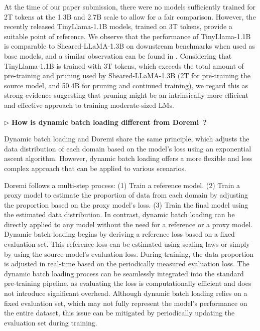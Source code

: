 At the time of our paper submission, there were no models sufficiently trained for 2T tokens at the 1.3B and 2.7B scale to allow for a fair comparison. However, the recently released TinyLlama-1.1B models, trained on 3T tokens, provide a suitable point of reference. We observe that the performance of TinyLlama-1.1B is comparable to Sheared-LLaMA-1.3B on downstream benchmarks when used as base models, and a similar observation can be found in \citet{wang2023pangu}.
Considering that TinyLlama-1.1B is trained with 3T tokens, which exceeds the total amount of pre-training and pruning used by Sheared-LLaMA-1.3B (2T for pre-training the source model, and 50.4B for pruning and continued training), we regard this as strong evidence suggesting that pruning might be an intrinsically more efficient and effective approach to training moderate-sized LMs.

$\triangleright$ \textbf{How is dynamic batch loading different from Doremi~\citep{xie2023doremi}?}

Dynamic batch loading and Doremi share the same principle, which adjusts the data distribution of each domain based on the model's loss using an exponential ascent algorithm. However, dynamic batch loading offers a more flexible and less complex approach that can be applied to various scenarios.

Doremi follows a multi-step process: (1) Train a reference model. (2) Train a proxy model to estimate the proportion of data from each domain by adjusting the proportion based on the proxy model's loss. (3) Train the final model using the estimated data distribution. In contrast, dynamic batch loading can be directly applied to any model without the need for a reference or a proxy model. Dynamic batch loading begins by deriving a reference loss based on a fixed evaluation set. This reference loss can be estimated using scaling laws or simply by using the source model's evaluation loss. During training, the data proportion is adjusted in real-time based on the periodically measured evaluation loss. The dynamic batch loading process can be seamlessly integrated into the standard pre-training pipeline, as evaluating the loss is computationally efficient and does not introduce significant overhead. Although dynamic batch loading relies on a fixed evaluation set, which may not fully represent the model's performance on the entire dataset, this issue can be mitigated by periodically updating the evaluation set during training.

